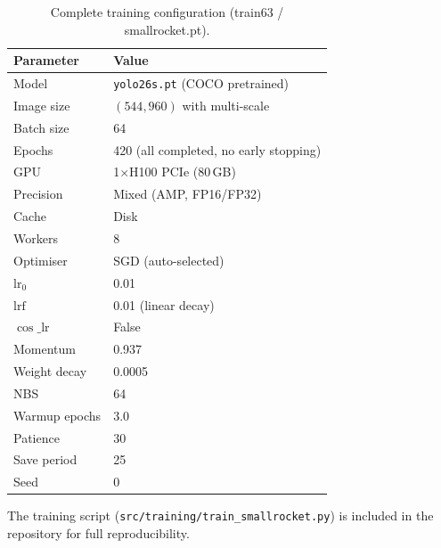 \documentclass[12pt, titlepage]{article}
\begin{document}
\begin{table}[H]
  \centering
  \caption{Complete training configuration (train63 / smallrocket.pt).}
  \label{tab:train_config}
  \begin{tabular}{@{}ll@{}}
    \toprule
    \textbf{Parameter} & \textbf{Value}                         \\
    \midrule
    Model              & \texttt{yolo26s.pt} (COCO pretrained)  \\
    Image size         & $(544, 960)$ with multi-scale          \\
    Batch size         & 64                                     \\
    Epochs             & 420 (all completed, no early stopping) \\
    GPU                & 1$\times$H100 PCIe (80\,GB)            \\
    Precision          & Mixed (AMP, FP16/FP32)                 \\
    Cache              & Disk                                   \\
    Workers            & 8                                      \\
    \midrule
    Optimiser          & SGD (auto-selected)                    \\
    $\text{lr}_0$      & 0.01                                   \\
    $\text{lrf}$       & 0.01 (linear decay)                    \\
    $\cos\_\text{lr}$  & False                                  \\
    Momentum           & 0.937                                  \\
    Weight decay       & 0.0005                                 \\
    NBS                & 64                                     \\
    Warmup epochs      & 3.0                                    \\
    \midrule
    Patience           & 30                                     \\
    Save period        & 25                                     \\
    Seed               & 0                                      \\
    \bottomrule
  \end{tabular}
\end{table}

The training script (\texttt{src/training/train\_smallrocket.py}) is included
in the repository for full reproducibility.
\end{document}
